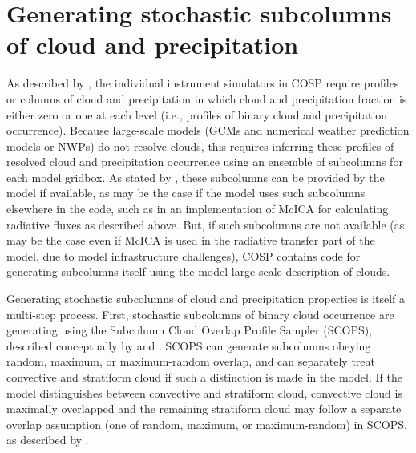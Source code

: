 
\section{Generating stochastic subcolumns of cloud and precipitation}
As described by \cite{bodas-salcedo_et_al_2011}, the individual instrument simulators in COSP require profiles or columns of cloud and precipitation in which cloud and precipitation fraction is either zero or one at each level (i.e., profiles of binary cloud and precipitation occurrence). Because large-scale models (GCMs and numerical weather prediction models or NWPs) do not resolve clouds, this requires inferring these profiles of resolved cloud and precipitation occurrence using an ensemble of subcolumns for each model gridbox. As stated by \cite{bodas-salcedo_et_al_2011}, these subcolumns can be provided by the model if available, as may be the case if the model uses such subcolumns elsewhere in the code, such as in an implementation of McICA for calculating radiative fluxes as described above. But, if such subcolumns are not available (as may be the case even if McICA is used in the radiative transfer part of the model, due to model infrastructure challenges), COSP contains code for generating subcolumns itself using the model large-scale description of clouds. 

Generating stochastic subcolumns of cloud and precipitation properties is itself a multi-step process. First, stochastic subcolumns of binary cloud occurrence are generating using the Subcolumn Cloud Overlap Profile Sampler (SCOPS), described conceptually by \cite{klein_and_jakob_1999} and \cite{webb_et_al_2001}. SCOPS can generate subcolumns obeying random, maximum, or maximum-random overlap, and can separately treat convective and stratiform cloud if such a distinction is made in the model. If the model distinguishes between convective and stratiform cloud, convective cloud is maximally overlapped and the remaining stratiform cloud may follow a separate overlap assumption (one of random, maximum, or maximum-random) in SCOPS, as described by \cite{webb_et_al_2001}.

